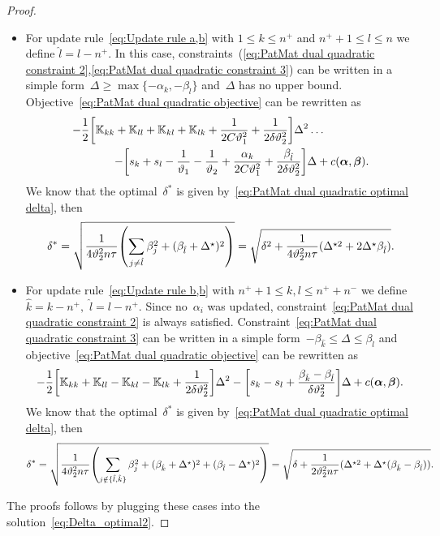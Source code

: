 \begin{proof}
\begin{itemize}
    \item For update rule~\eqref{eq:Update rule a,b} with $1 \le k \le n^+$ and $n^+ + 1 \le l \le n$ we define $\hat{l} = l - n^+.$ In this case, constraints~(\ref{eq:PatMat dual quadratic constraint 2},\ref{eq:PatMat dual quadratic constraint 3}) can be written in a simple form~$\Delta \geq \max \{- \alpha_k, - \beta_{\hat{l}}\}$ and~$\Delta$ has no upper bound. Objective~\eqref{eq:PatMat dual quadratic objective} can be rewritten as
    \begin{equation*}
      \begin{split}
        - \frac{1}{2} \Brac[s]{\K_{kk} + \K_{ll} + \K_{kl} + \K_{lk} + \frac{1}{2C\vartheta_1^2} + \frac{1}{2\delta\vartheta_2^2}} \Delta^2 \dots \qquad\qquad \\ 
        - \Brac[s]{s_k + s_l - \frac{1}{\vartheta_1} - \frac{1}{\vartheta_2} + \frac{\alpha_k}{2C\vartheta_1^2} + \frac{\beta_{\hat l}}{2\delta\vartheta_2^2}} \Delta + c(\bm{\alpha}, \bm{\beta}).
      \end{split}
    \end{equation*}
    We know that the optimal~$\delta^*$ is given by~\eqref{eq:PatMat dual quadratic optimal delta}, then
    \begin{equation*}
      \delta^*
      = \sqrt{\frac{1}{4\vartheta_2^2 n \tau} \Brac{\sum_{j\neq \hat l} \beta_j^2 + (\beta_{\hat{l}} + \Delta^\star)^2}}
      = \sqrt{\delta^2 + \frac{1}{4\vartheta_2^2 n \tau} (\Delta^{\star2} + 2\Delta^\star \beta_{\hat{l}})}.
    \end{equation*}

    \item For update rule~\eqref{eq:Update rule b,b} with $n^+ + 1\le k,l \le n^+ + n^-$ we define $\hat{k} = k - n^+,$ $\hat{l} = l - n^+.$ Since no~$\alpha_i$ was updated, constraint~\eqref{eq:PatMat dual quadratic constraint 2} is always satisfied. Constraint~\eqref{eq:PatMat dual quadratic constraint 3} can be written in a simple form~$-\beta_{\hat{k}} \leq \Delta \leq \beta_{\hat{l}}$ and objective~\eqref{eq:PatMat dual quadratic objective} can be rewritten as
    \begin{equation*}
      - \frac{1}{2} \Brac[s]{\K_{kk} + \K_{ll} - \K_{kl} - \K_{lk} + \frac{1}{2\delta\vartheta_2^2}} \Delta^2 - \Brac[s]{s_k - s_l + \frac{\beta_{\hat{k}} - \beta_{\hat{l}}}{\delta\vartheta_2^2}} \Delta + c(\bm{\alpha}, \bm{\beta}).
    \end{equation*}
    We know that the optimal~$\delta^*$ is given by~\eqref{eq:PatMat dual quadratic optimal delta}, then
    \begin{equation*}
      \delta^*
      = \sqrt{\frac{1}{4\vartheta_2^2 n \tau} \Brac{\sum_{j \notin \{\hat{l}, \hat{k}\}} \beta_j^2 + (\beta_{\hat{k}} + \Delta^\star)^2 + (\beta_{\hat{l}} - \Delta^\star)^2}} 
      = \sqrt{\delta + \frac{1}{2\vartheta_2^2 n \tau} (\Delta^{\star2} + \Delta^\star (\beta_{\hat{k}} - \beta_{\hat{l}}))}.
    \end{equation*}
  \end{itemize}
  The proofs follows by plugging these cases into the solution~\eqref{eq:Delta_optimal2}.
\end{proof}

